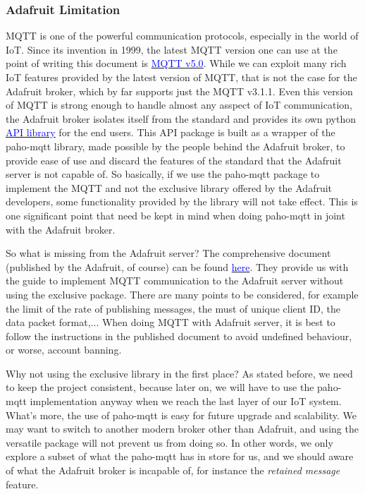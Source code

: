\subsubsection{Adafruit Limitation}
MQTT is one of the powerful communication protocols, especially in the world of IoT. Since its invention in 1999, the latest MQTT version one can use at the point of writing this document is \href{https://docs.oasis-open.org/mqtt/mqtt/v5.0/mqtt-v5.0.html}{\textcolor{blue}{MQTT v5.0}}. While we can exploit many rich IoT features provided by the latest version of MQTT, that is not the case for the Adafruit broker, which by far supports just the MQTT v3.1.1. Even this version of MQTT is strong enough to handle almost any asspect of IoT communication, the Adafruit broker isolates itself from the standard and provides its own python \href{https://pypi.org/project/adafruit-io/}{\textcolor{blue}{API library}} for the end users. This API package is built as a wrapper of the paho-mqtt library, made possible by the people behind the Adafruit broker, to provide ease of use and discard the features of the standard that the Adafruit server is not capable of. So basically, if we use the paho-mqtt package to implement the MQTT and not the exclusive library offered by the Adafruit developers, some functionality provided by the library will not take effect. This is one significant point that need be kept in mind when doing paho-mqtt in joint with the Adafruit broker.

So what is missing from the Adafruit server? The comprehensive document (published by the Adafruit, of course) can be found \href{https://io.adafruit.com/api/docs/mqtt.html#adafruit-io-mqtt-api}{\textcolor{blue}{here}}. They provide us with the guide to implement MQTT communication to the Adafruit server without using the exclusive package. There are many points to be considered, for example the limit of the rate of publishing messages, the must of unique client ID, the data packet format,... When doing MQTT with Adafruit server, it is best to follow the instructions in the published document to avoid undefined behaviour, or worse, account banning.

Why not using the exclusive library in the first place? As stated before, we need to keep the project consistent, because later on, we will have to use the paho-mqtt implementation anyway when we reach the last layer of our IoT system. What's more, the use of paho-mqtt is easy for future upgrade and scalability. We may want to switch to another modern broker other than Adafruit, and using the versatile package will not prevent us from doing so. In other words, we only explore a subset of what the paho-mqtt has in store for us, and we should aware of what the Adafruit broker is incapable of, for instance the \textit{retained message} feature.  

